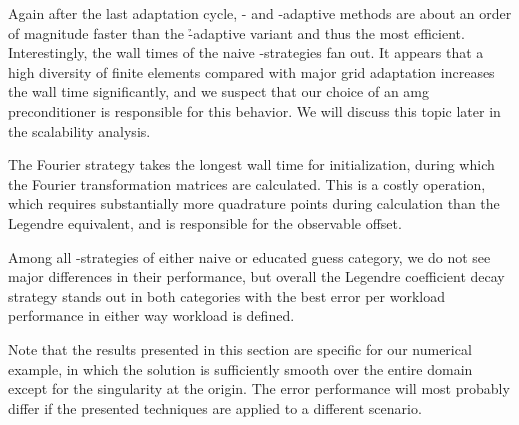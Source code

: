 
Again after the last adaptation cycle, \p- and \hp-adaptive methods are about an order of magnitude faster than the \h-adaptive variant and thus the most efficient. Interestingly, the wall times of the naive \hp-strategies fan out. It appears that a high diversity of finite elements compared with major grid adaptation increases the wall time significantly, and we suspect that our choice of an \gls{amg} preconditioner is responsible for this behavior. We will discuss this topic later in the scalability analysis.

The Fourier strategy takes the longest wall time for initialization, during which the Fourier transformation matrices are calculated. This is a costly operation, which requires substantially more quadrature points during calculation than the Legendre equivalent, and is responsible for the observable offset.

Among all \hp-strategies of either naive or educated guess category, we do not see major differences in their performance, but overall the Legendre coefficient decay strategy stands out in both categories with the best error per workload performance in either way workload is defined.

Note that the results presented in this section are specific for our numerical example, in which the solution is sufficiently smooth over the entire domain except for the singularity at the origin. The error performance will most probably differ if the presented techniques are applied to a different scenario.



